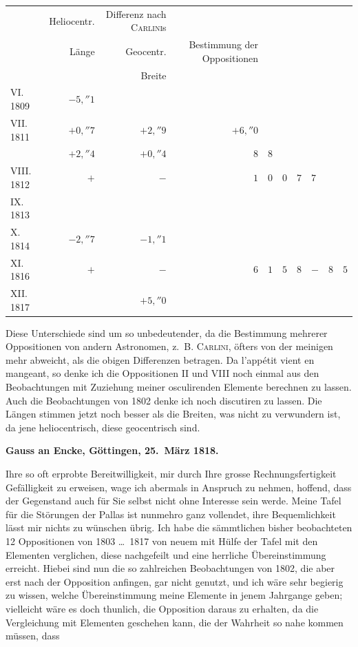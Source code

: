 \documentclass[12pt,a4paper]{article}
\begin{document}
\newpage
\setcounter{page}{440}
%
\begin{center}
\begin{tabular}{l@{\quad}r@{\quad}r@{\quad}r}
\toprule
& Heliocentr. & Differenz nach \textsc{Carlini}s \\
& Länge & Geocentr. & Bestimmung der Oppositionen \\
& & Breite \\
\midrule
VI. 1809 & $-5{,}''1$ \\
VII. 1811 & $+0{,}''7$ & $+2{,}''9$ & $+6{,}''0$ \\
& $+2{,}''4$ & $+0{,}''4$ & $8$ & $8$ \\
VIII. 1812 & $+$ & $-$ & $1$ & $0$ & $0$ & $7$ & $7$ \\
IX. 1813 & & & \\
X. 1814 & $-2{,}''7$ & $-1{,}''1$ \\
XI. 1816 & $+$ & $-$ & $6$ & $1$ & $5$ & $8$ & $-$ & $8$ & $5$ \\
XII. 1817 & & $+5{,}''0$ \\
\bottomrule
\end{tabular}
\end{center}
Diese Unterschiede sind um so unbedeutender, da die Bestimmung mehrerer Oppositionen von andern Astronomen, z.~B. \textsc{Carlini}, öfters von der meinigen mehr abweicht, als die obigen Differenzen betragen. Da l'appétit vient en mangeant, so denke ich die Oppositionen II und VIII noch einmal aus den Beobachtungen mit Zuziehung meiner osculirenden Elemente berechnen zu lassen. Auch die Beobachtungen von 1802 denke ich noch discutiren zu lassen. Die Längen stimmen jetzt noch besser als die Breiten, was nicht zu verwundern ist, da jene heliocentrisch, diese geocentrisch sind.

\medskip\noindent
\textbf{Gauss an Encke, Göttingen, 25.~März 1818.}

Ihre so oft erprobte Bereitwilligkeit, mir durch Ihre grosse Rechnungsfertigkeit Gefälligkeit zu erweisen, wage ich abermals in Anspruch zu nehmen, hoffend, dass der Gegenstand auch für Sie selbst nicht ohne Interesse sein werde. Meine Tafel für die Störungen der Pallas ist nunmehro ganz vollendet, ihre Bequemlichkeit lässt mir nichts zu wünschen übrig. Ich habe die sämmtlichen bisher beobachteten 12 Oppositionen von 1803 \ldots\ 1817 von neuem mit Hülfe der Tafel mit den Elementen verglichen, diese nachgefeilt und eine herrliche Übereinstimmung erreicht. Hiebei sind nun die so zahlreichen Beobachtungen von 1802, die aber erst nach der Opposition anfingen, gar nicht genutzt, und ich wäre sehr begierig zu wissen, welche Übereinstimmung meine Elemente in jenem Jahrgange geben; vielleicht wäre es doch thunlich, die Opposition daraus zu erhalten, da die Vergleichung mit Elementen geschehen kann, die der Wahrheit so nahe kommen müssen, dass
\end{document}
